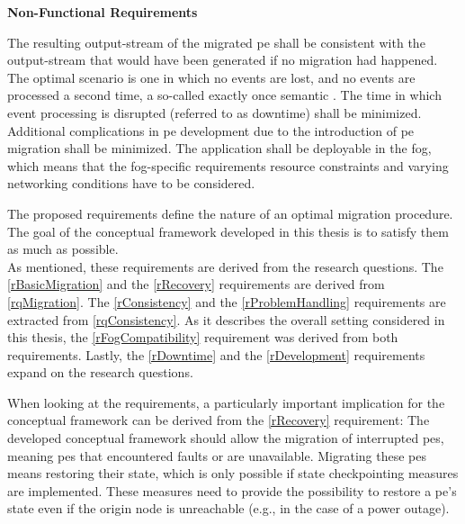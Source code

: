 \textbf{Non-Functional Requirements}
\begin{enumerate}[wide=0em, labelindent=0.25cm, leftmargin=4.25cm, labelwidth=4cm, labelsep=0em]
    \label{rConsistency} The resulting output-stream of the migrated \gls{pe} shall be consistent with the output-stream that would have been generated if no migration had happened. The optimal scenario is one in which no events are lost, and no events are processed a second time, a so-called exactly once semantic \cite{Huang.2001}.
    \label{rDowntime} The time in which event processing is disrupted (referred to as downtime) shall be minimized.
    \label{rDevelopment} Additional complications in \gls{pe} development due to the introduction of \gls{pe} migration shall be minimized.
    \label{rFogCompatibility} The application shall be deployable in the fog, which means that the fog-specific requirements resource constraints \cite{Yousefpour.2019} and varying networking conditions \cite{Puliafito.2018} have to be considered.
\end{enumerate}

The proposed requirements define the nature of an optimal migration procedure. The goal of the conceptual framework developed in this thesis is to satisfy them as much as possible.\\
As mentioned, these requirements are derived from the research questions. The \ref{rBasicMigration} and the \ref{rRecovery} requirements are derived from \ref{rqMigration}. The \ref{rConsistency} and the \ref{rProblemHandling} requirements are extracted from \ref{rqConsistency}. As it describes the overall setting considered in this thesis, the \ref{rFogCompatibility} requirement was derived from both requirements. Lastly, the \ref{rDowntime} and the \ref{rDevelopment} requirements expand on the research questions.\par
When looking at the requirements, a particularly important implication for the conceptual framework can be derived from the \ref{rRecovery} requirement: The developed conceptual framework should allow the migration of interrupted \gls{pe}s, meaning \gls{pe}s that encountered faults or are unavailable. Migrating these \gls{pe}s means restoring their state, which is only possible if state checkpointing measures are implemented. These measures need to provide the possibility to restore a \gls{pe}'s state even if the origin node is unreachable (e.g., in the case of a power outage).

